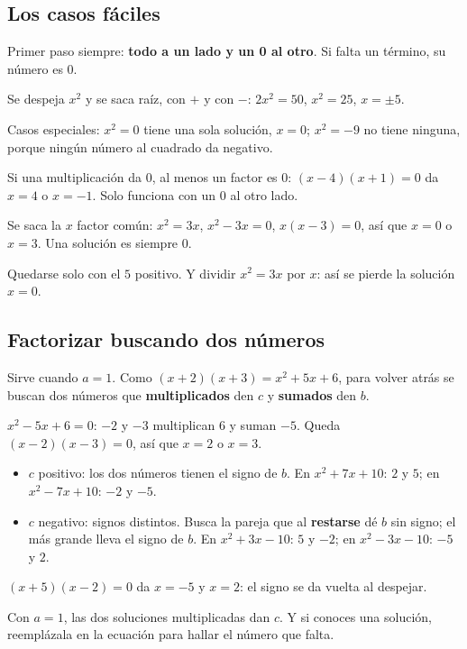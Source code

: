 \subsection{Los casos fáciles}
Primer paso siempre: \textbf{todo a un lado y un 0 al otro}. Si falta un término, su número es 0.
\begin{clave} Se despeja $x^2$ y se saca raíz, con $+$ y con $-$: $2x^2 = 50$, $x^2 = 25$, $x = \pm 5$.\end{clave}
Casos especiales: $x^2 = 0$ tiene una sola solución, $x = 0$; $x^2 = -9$ no tiene ninguna, porque ningún número al cuadrado da negativo.
\begin{clave} Si una multiplicación da 0, al menos un factor es 0: $(x - 4)(x + 1) = 0$ da $x = 4$ o $x = -1$. Solo funciona con un 0 al otro lado.\end{clave}
\begin{clave} Se saca la $x$ factor común: $x^2 = 3x$, $x^2 - 3x = 0$, $x(x - 3) = 0$, así que $x = 0$ o $x = 3$. Una solución es siempre $0$.\end{clave}
\begin{ojo} Quedarse solo con el $5$ positivo. Y dividir $x^2 = 3x$ por $x$: así se pierde la solución $x = 0$.\end{ojo}

\subsection{Factorizar buscando dos números}
Sirve cuando $a = 1$. Como $(x + 2)(x + 3) = x^2 + 5x + 6$, para volver atrás se buscan dos números que \textbf{multiplicados} den $c$ y \textbf{sumados} den $b$.
\begin{ejemplo} $x^2 - 5x + 6 = 0$: $-2$ y $-3$ multiplican $6$ y suman $-5$. Queda $(x - 2)(x - 3) = 0$, así que $x = 2$ o $x = 3$.\end{ejemplo}
\begin{clave}
\begin{itemize}
  \item $c$ positivo: los dos números tienen el signo de $b$. En $x^2 + 7x + 10$: $2$ y $5$; en $x^2 - 7x + 10$: $-2$ y $-5$.
  \item $c$ negativo: signos distintos. Busca la pareja que al \textbf{restarse} dé $b$ sin signo; el más grande lleva el signo de $b$. En $x^2 + 3x - 10$: $5$ y $-2$; en $x^2 - 3x - 10$: $-5$ y $2$.
\end{itemize}
\end{clave}
\begin{ojo} $(x + 5)(x - 2) = 0$ da $x = -5$ y $x = 2$: el signo se da vuelta al despejar.\end{ojo}
Con $a = 1$, las dos soluciones multiplicadas dan $c$. Y si conoces una solución, reemplázala en la ecuación para hallar el número que falta.

